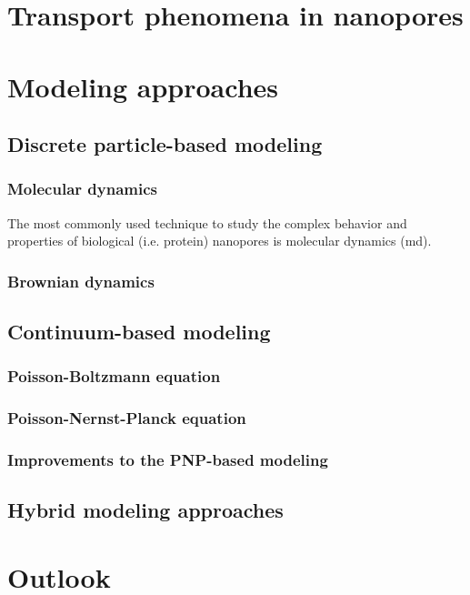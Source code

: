 \section{Transport phenomena in nanopores}


\section{Modeling approaches}

\subsection{Discrete particle-based modeling}

\subsubsection{Molecular dynamics}
The most commonly used technique to study the complex behavior and properties of biological (i.e. protein) nanopores is molecular dynamics (\gls{md}).

\subsubsection{Brownian dynamics}




\subsection{Continuum-based modeling}

\subsubsection{Poisson-Boltzmann equation}

\subsubsection{Poisson-Nernst-Planck equation}

\subsubsection{Improvements to the PNP-based modeling}

\subsection{Hybrid modeling approaches}

\section{Outlook}


